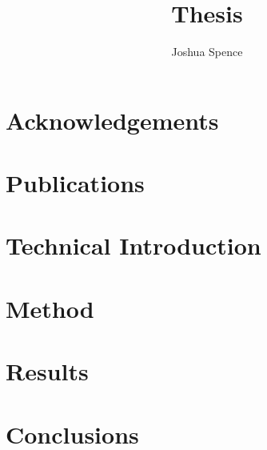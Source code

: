 \documentclass[a4paper]{report}
\begin{document}
\title{Thesis}
\author{Joshua Spence}

\maketitle


\chapter*{Acknowledgements}

\chapter*{Publications}

\begin{abstract}
\end{abstract}

\tableofcontents
\listoffigures
\listoftables








\chapter{Technical Introduction}
\label{ch:techintro}

\chapter{Method}
\label{ch:method}

\chapter{Results}
\label{ch:results}

\chapter{Conclusions}
\label{ch:conc}

\nocite{*}



\printglossary
\printindex
\end{document}
